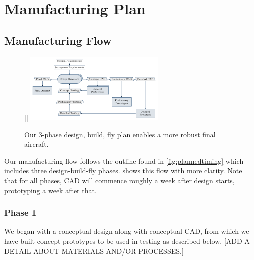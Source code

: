 \documentclass[proposal]{byu-aero}
\begin{document}

 \section{Manufacturing Plan} %
\label{sec:ManufacturingPlan}


\subsection{Manufacturing Flow}
\label{ssec:ManufacturingFlow}
\begin{figure}
	\centering
		\raisebox{0pt}[\dimexpr{}\baselineskip\relax]{
	\includegraphics[width=0.6\textwidth]{manufacturing_flow}}
	\caption{Our 3-phase design, build, fly plan enables a more robust final aircraft.}
	\label{fig:manufacturingplan}
\end{figure}

Our manufacturing flow follows the outline found in \cref{fig:plannedtiming} which includes three design-build-fly phases.   shows this flow with more clarity.  Note that for all phases, CAD will commence roughly a week after design starts, prototyping a week after that.

\subsubsection{Phase 1} We began with a conceptual design along with conceptual CAD, from which we have built concept prototypes to be used in testing as described below. {\color{BYUred}[ADD A DETAIL ABOUT MATERIALS AND/OR PROCESSES.]}
\end{document}
